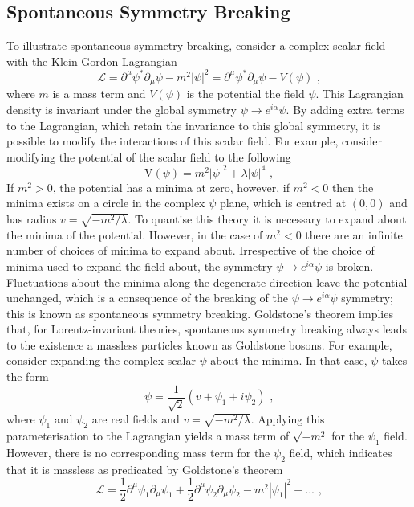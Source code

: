 \subsection{Spontaneous Symmetry Breaking}
\label{sec:ssb}
To illustrate spontaneous symmetry breaking, consider a complex scalar field \psi with the Klein-Gordon Lagrangian
%
\begin{equation}
\mathcal{L} = \partial^{\mu} \psi^{*} \partial_{\mu} \psi -m^{2} |\psi|^{2} = \partial^{\mu} \psi^{*} \partial_{\mu} \psi - V(\psi) \text{ ,}
\label{equ:kleingordon}
\end{equation}
%
\noindent where $m$ is a mass term and $V(\psi)$ is the potential the field $\psi$.  This Lagrangian density is invariant under the global symmetry $\psi \rightarrow e^{i\alpha} \psi$.  By adding extra terms to the Lagrangian, which retain the invariance to this global symmetry, it is possible to modify the interactions of this scalar field.  For example, consider modifying the potential of the scalar field to the following
%
\begin{equation}
\text{V}(\psi) = m^{2}|\psi|^{2} + \lambda |\psi|^{4} \text{ ,}
\end{equation}
%
\noindent If $m^{2} > 0$, the potential has a minima at zero, however, if $m^{2} < 0$ then the minima exists on a circle in the complex $\psi$ plane, which is centred at $(0,0)$ and has radius $v = \sqrt{-m^{2}/\lambda}$.  To quantise this theory it is necessary to expand about the minima of the potential.  However, in the case of $m^{2} < 0$ there are an infinite number of choices of minima to expand about.  Irrespective of the choice of minima used to expand the field about, the symmetry $\psi \rightarrow e^{i\alpha} \psi$ is broken.  Fluctuations about the minima along the degenerate direction leave the potential unchanged, which is a consequence of the breaking of the $\psi \rightarrow e^{i\alpha} \psi$ symmetry; this is known as spontaneous symmetry breaking.  Goldstone's theorem \cite{Goldstone:1962es} implies that, for Lorentz-invariant theories, spontaneous symmetry breaking always leads to the existence a massless particles known as Goldstone bosons.  For example, consider expanding the complex scalar $\psi$ about the minima.  In that case, $\psi$ takes the form
%
\begin{equation}
\psi = \frac{1}{\sqrt{2}}(v + \psi_{1} + i \psi_{2}) \text{ ,}
\label{equ:minima}
\end{equation}
%
\noindent where $\psi_{1}$ and $\psi_{2}$ are real fields and $v = \sqrt{-m^{2}/\lambda}$.  Applying this parameterisation to the Lagrangian yields a mass term of $\sqrt{-m^{2}}$ for the $\psi_{1}$ field.  However, there is no corresponding mass term for the $\psi_{2}$ field, which indicates that it is massless as predicated by Goldstone's theorem
%
\begin{equation}
\mathcal{L} = \frac{1}{2}\partial^{\mu} \psi_{1} \partial_{\mu} \psi_{1} + \frac{1}{2}\partial^{\mu} \psi_{2} \partial_{\mu} \psi_{2} - m^{2}|\psi_{1}|^{2} + ... \text{ ,}
\end{equation}
%

